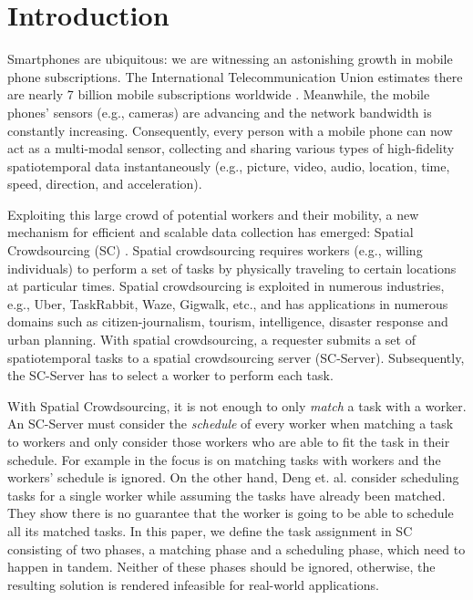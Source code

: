 \section{Introduction}

Smartphones are ubiquitous: we are witnessing an astonishing growth in mobile phone subscriptions. The International Telecommunication Union estimates there are nearly 7 billion mobile subscriptions worldwide \cite{Mobiforge14}. Meanwhile, the mobile phones' sensors (e.g., cameras) are advancing and the network bandwidth is constantly increasing. Consequently, every person with a mobile phone can now act as a multi-modal sensor, collecting and sharing various types of high-fidelity spatiotemporal data instantaneously (e.g., picture, video, audio, location, time, speed, direction, and acceleration).

Exploiting this large crowd of potential workers and their mobility, a new mechanism for efficient and scalable data collection has emerged: Spatial Crowdsourcing (SC) \cite{Kazemi12}. Spatial crowdsourcing requires workers (e.g., willing individuals) to perform a set of tasks by physically traveling to certain locations at particular times. Spatial crowdsourcing is exploited in numerous industries, e.g., Uber, TaskRabbit, Waze, Gigwalk, etc., and has applications in numerous domains such as citizen-journalism, tourism, intelligence, disaster response and urban planning. With spatial crowdsourcing, a requester submits a set of spatiotemporal tasks to a spatial crowdsourcing server (SC-Server). Subsequently, the SC-Server has to select a worker to perform each task.

With Spatial Crowdsourcing, it is not enough to only \textit{match} a task with a worker. An SC-Server must consider the \textit{schedule} of every worker when matching a task to workers and only consider those workers who are able to fit the task in their schedule. For example in \cite{Kazemi13,Alfarrarjeh15} the focus is on matching tasks with workers and the workers' schedule is ignored. On the other hand, Deng et. al. \cite{Deng13} consider scheduling tasks for a single worker while assuming the tasks have already been matched. They show there is no guarantee that the worker is going to be able to schedule all its matched tasks. In this paper, we define the task assignment in SC consisting of two phases, a matching phase and a scheduling phase, which need to happen in tandem. Neither of these phases should be ignored, otherwise, the resulting solution is rendered infeasible for real-world applications.

